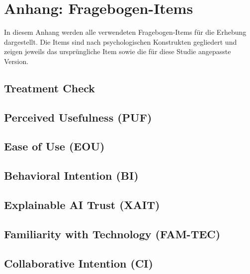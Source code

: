 \documentclass[../main.tex]{subfiles}
\begin{document}
\section{Anhang: Fragebogen-Items}

In diesem Anhang werden alle verwendeten Fragebogen-Items für die Erhebung dargestellt. Die Items sind nach psychologischen Konstrukten gegliedert und zeigen jeweils das ursprüngliche Item sowie die für diese Studie angepasste Version.

\subsection{Treatment Check}
\label{subsec:treatment-check-items}



\subsection{Perceived Usefulness (PUF)}
\label{subsec:puf-items}



\subsection{Ease of Use (EOU)}
\label{subsec:eou-items}



\subsection{Behavioral Intention (BI)}
\label{subsec:bi-items}



\subsection{Explainable AI Trust (XAIT)}
\label{subsec:xait-items}



\subsection{Familiarity with Technology (FAM-TEC)}
\label{subsec:fam-tec-items}



\subsection{Collaborative Intention (CI)}
\label{subsec:ci-items}


\end{document}
